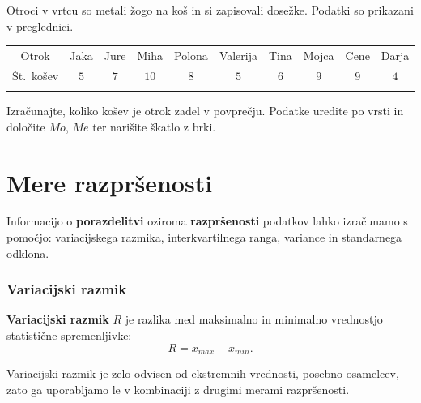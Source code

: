             \begin{naloga}
             
             Otroci v vrtcu so metali žogo na koš in si zapisovali dosežke. Podatki so prikazani v preglednici. 

                 \begin{table}[H]
                     \centering
                     \begin{tabular}{||c|c|c|c|c|c|c|c|c|c||} 
                     \hhline{|t:==========:t|}
                     \rowcolor[rgb]{0.843,0.718,0.718} 
                     Otrok  & Jaka & Jure & Miha & Polona & Valerija & Tina & Mojca & Cene & Darja   \\ 
                     \hhline{|:==========:|}
                     Št.~košev & $5$ & $7$ & $10$ & $8$ & $5$ & $6$ & $9$ & $9$& $4$  \\ 
                     \hhline{|b:==========:b|}
                     \end{tabular}
                 \end{table}

                Izračunajte, koliko košev je otrok zadel v povprečju. Podatke uredite po vrsti in določite $Mo$, $Me$ ter narišite škatlo z brki.

            \end{naloga}

     


\newpage

    \section{Mere razpršenosti}

        

            
                Informacijo o \textbf{porazdelitvi} oziroma \textbf{razpršenosti} podatkov lahko izračunamo s pomočjo: 
                variacijskega razmika, interkvartilnega ranga, variance in standarnega odklona.
            
            \subsubsection{Variacijski razmik}
                \textbf{Variacijski razmik} $R$ je razlika med maksimalno in minimalno vrednostjo statistične spremenljivke:
                $$R=x_{max}-x_{min}.$$
            

            
                Variacijski razmik je zelo odvisen od ekstremnih vrednosti, posebno osamelcev, 
                zato ga uporabljamo le v kombinaciji z drugimi merami razpršenosti.
            

